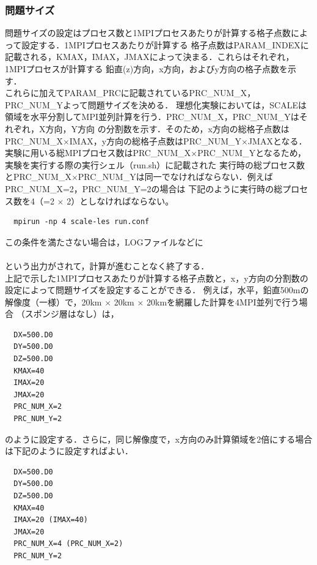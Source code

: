\subsubsection{問題サイズ}
問題サイズの設定はプロセス数と1MPIプロセスあたりが計算する格子点数によって設定する．1MPIプロセスあたりが計算する
格子点数はPARAM\_INDEXに記載される，KMAX，IMAX，JMAXによって決まる．これらはそれぞれ，1MPIプロセスが計算する
鉛直(z)方向，x方向，およびy方向の格子点数を示す．\\
これらに加えてPARAM\_PRCに記載されているPRC\_NUM\_X，PRC\_NUM\_Yよって問題サイズを決める．
理想化実験においては，SCALEは領域を水平分割してMPI並列計算を行う．PRC\_NUM\_X，PRC\_NUM\_Yはそれぞれ，X方向，Y方向
の分割数を示す．そのため，x方向の総格子点数はPRC\_NUM\_X$\times$IMAX，y方向の総格子点数はPRC\_NUM\_Y$\times$JMAXとなる．\\
実験に用いる総MPIプロセス数はPRC\_NUM\_X$\times$PRC\_NUM\_Yとなるため，実験を実行する際の実行シェル（run.sh）に記載された
実行時の総プロセス数とPRC\_NUM\_X$\times$PRC\_NUM\_Yは同一でなければならない．例えばPRC\_NUM\_X=2，PRC\_NUM\_Y=2の場合は
下記のように実行時の総プロセス数を4（=2 $\times $ 2）としなければならない。

\begin{verbatim}
  mpirun -np 4 scale-les run.conf
\end{verbatim}

この条件を満たさない場合は，LOGファイルなどに\\
\\

という出力がされて，計算が進むことなく終了する．\\
上記で示した1MPIプロセスあたりが計算する格子点数と，x，y方向の分割数の設定によって問題サイズを設定することができる．
例えば，水平，鉛直500mの解像度（一様）で，20km $\times$ 20km $\times$ 20kmを網羅した計算を4MPI並列で行う場合
（スポンジ層はなし）は， 

\begin{verbatim}
  DX=500.D0
  DY=500.D0
  DZ=500.D0
  KMAX=40
  IMAX=20
  JMAX=20
  PRC_NUM_X=2
  PRC_NUM_Y=2
\end{verbatim}

のように設定する．さらに，同じ解像度で，x方向のみ計算領域を2倍にする場合は下記のように設定すればよい．

\begin{verbatim}
  DX=500.D0
  DY=500.D0
  DZ=500.D0
  KMAX=40
  IMAX=20 (IMAX=40)
  JMAX=20
  PRC_NUM_X=4 (PRC_NUM_X=2)
  PRC_NUM_Y=2
\end{verbatim}

